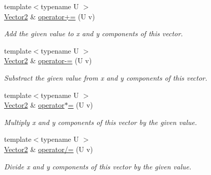 \begin{DoxyCompactItemize}
{\footnotesize template$<$typename U $>$ }\\\hyperlink{classfuzzy_telegram_1_1_vector2}{Vector2} \& \hyperlink{classfuzzy_telegram_1_1_vector2_a70505acd518ec61f029155ae7b333ac1}{operator+=} (U v)
\begin{DoxyCompactList}\small\item\em Add the given value to x and y components of this vector. \end{DoxyCompactList}\item 
{\footnotesize template$<$typename U $>$ }\\\hyperlink{classfuzzy_telegram_1_1_vector2}{Vector2} \& \hyperlink{classfuzzy_telegram_1_1_vector2_a84540b23cc68ae7a5b62ba0379bac85b}{operator-\/=} (U v)
\begin{DoxyCompactList}\small\item\em Substract the given value from x and y components of this vector. \end{DoxyCompactList}\item 
{\footnotesize template$<$typename U $>$ }\\\hyperlink{classfuzzy_telegram_1_1_vector2}{Vector2} \& \hyperlink{classfuzzy_telegram_1_1_vector2_a0b2852b7f30db36d4e0293c1eabb7e99}{operator$\ast$=} (U v)
\begin{DoxyCompactList}\small\item\em Multiply x and y components of this vector by the given value. \end{DoxyCompactList}\item 
{\footnotesize template$<$typename U $>$ }\\\hyperlink{classfuzzy_telegram_1_1_vector2}{Vector2} \& \hyperlink{classfuzzy_telegram_1_1_vector2_a753b33c65bfd6257dfef84fc4f14c357}{operator/=} (U v)
\begin{DoxyCompactList}\small\item\em Divide x and y components of this vector by the given value. \end{DoxyCompactList}\end{DoxyCompactItemize}
